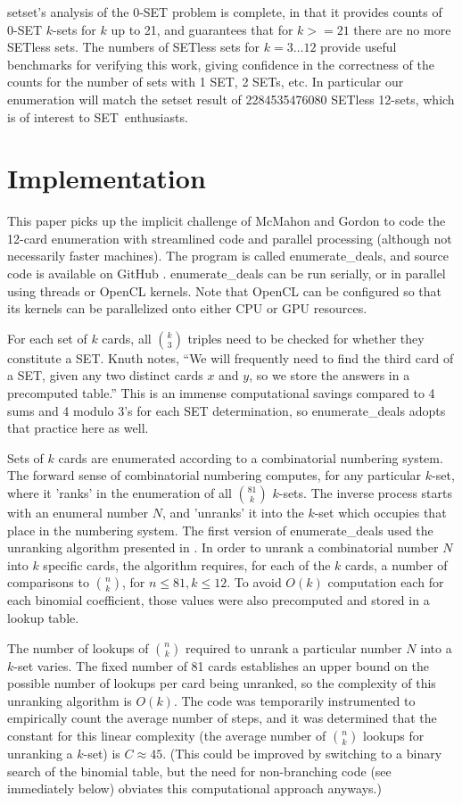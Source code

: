 \documentclass[10pt]{amsart}
\newcommand{\SETb}{SET\texttrademark\ } %
\newcommand{\SETSET}{{\sc setset}}
\newcommand{\SETSETb}{{\sc setset }}
\newcommand{\ED}{{\sc enumerate\_deals}}
\newcommand{\EDb}{{\sc enumerate\_deals }}
\begin{document}
\SETSET's analysis of the 0-SET problem is complete, in that it provides counts
of 0-SET $k$-sets for $k$ up to 21, and \cite{MAXCAP} guarantees that for
$k>=21$ there are no more SETless sets. The numbers of SETless sets for
$k=3\ldots 12$ provide useful benchmarks for verifying this work, giving
confidence in the correctness of the counts for the number of sets with 1 SET, 2
SETs, etc. In particular our enumeration will match the \SETSETb result of
2284535476080 SETless 12-sets, which is of interest to \SETb enthusiasts.


\section{Implementation}
This paper picks up the implicit challenge of McMahon and Gordon to code the
12-card enumeration with streamlined code and parallel processing (although not
necessarily faster machines). The program is called \ED, and source code is
available on GitHub \cite{ME}. \EDb can be run serially, or in parallel using
threads or OpenCL \cite{OPENCL} kernels. Note that OpenCL can be configured so
that its kernels can be parallelized onto either CPU or GPU resources.

For each set of $k$ cards, all $\binom{k}{3}$ triples need to be checked for
whether they constitute a SET. Knuth notes, ``We will frequently need to find
the third card of a SET, given any two distinct cards $x$ and $y$, so we store
the answers in a precomputed table.''  This is an immense computational savings
compared to 4 sums and 4 modulo 3's for each SET determination, so \EDb adopts
that practice here as well.

Sets of $k$ cards are enumerated according to a combinatorial numbering
system. The forward sense of combinatorial numbering computes, for any
particular $k$-set, where it 'ranks' in the enumeration of all $\binom{81}{k}$
$k$-sets. The inverse process starts with an enumeral number $N$, and 'unranks'
it into the $k$-set which occupies that place in the numbering system. The first
version of \EDb used the unranking algorithm presented in \cite{WIKI}. In
order to unrank a combinatorial number $N$ into $k$ specific cards, the
algorithm requires, for each of the $k$ cards, a number of comparisons to
$\binom{n}{k}$, for $n\le 81, k\le 12$. To avoid $O(k)$ computation each for
each binomial coefficient, those values were also precomputed and stored in a
lookup table.

The number of lookups of $\binom{n}{k}$ required to unrank a particular number
$N$ into a $k$-set varies. The fixed number of 81 cards establishes an upper
bound on the possible number of lookups per card being unranked, so the
complexity of this unranking algorithm is $O(k)$. The code was temporarily
instrumented to empirically count the average number of steps, and it was
determined that the constant for this linear complexity (the average number of
$\binom{n}{k}$ lookups for unranking a $k$-set) is $C\approx 45$. (This could be
improved by switching to a binary search of the binomial table, but the need for
non-branching code (see immediately below) obviates this computational approach
anyways.)
\end{document}
